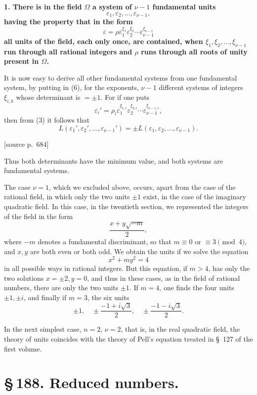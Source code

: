\documentclass[11pt]{article}
\newcommand{\srcpage}[1]{\par\medskip\noindent\textsf{[source p.~#1]}\par\smallskip}
\begin{document}
\textbf{1. There is in the field $\Omega$ a system of $\nu-1$ fundamental units}
\begin{equation}
\varepsilon_1,\varepsilon_2,\ldots,\varepsilon_{\nu-1},
\tag{5}
\end{equation}
\textbf{having the property that in the form}
\begin{equation}
\varepsilon=\rho\varepsilon_1^{\xi_1}\varepsilon_2^{\xi_2}\cdots\varepsilon_{\nu-1}^{\xi_{\nu-1}}
\tag{6}
\end{equation}
\textbf{all units of the field, each only once, are contained, when $\xi_1,\xi_2,\ldots,\xi_{\nu-1}$ run through all rational integers and $\rho$ runs through all roots of unity present in $\Omega$.}

It is now easy to derive all other fundamental systems from one fundamental system, by putting in (6), for the exponents, $\nu-1$ different systems of integers $\xi_{i,k}$ whose determinant is $=\pm1$. For if one puts
\[
\varepsilon_i'=\rho_i\varepsilon_1^{\xi_{1,i}}\varepsilon_2^{\xi_{2,i}}\cdots\varepsilon_{\nu-1}^{\xi_{\nu-1,i}},
\]
then from (3) it follows that
\[
L(\varepsilon_1',\varepsilon_2',\ldots,\varepsilon_{\nu-1}')=\pm L(\varepsilon_1,\varepsilon_2,\ldots,\varepsilon_{\nu-1}).
\]

\srcpage{684}
Thus both determinants have the minimum value, and both systems are fundamental systems.

The case $\nu=1$, which we excluded above, occurs, apart from the case of the rational field, in which only the two units $\pm1$ exist, in the case of the imaginary quadratic field. In this case, in the twentieth section, we represented the integers of the field in the form
\[
\frac{x+y\sqrt{-m}}{2},
\]
where $-m$ denotes a fundamental discriminant, so that $m\equiv0$ or $\equiv3\pmod 4$, and $x,y$ are both even or both odd. We obtain the units if we solve the equation
\[
x^2+my^2=4
\]
in all possible ways in rational integers. But this equation, if $m>4$, has only the two solutions $x=\pm2,y=0$, and thus in these cases, as in the field of rational numbers, there are only the two units $\pm1$. If $m=4$, one finds the four units $\pm1,\pm i$, and finally if $m=3$, the six units
\[
\pm1,
\quad \pm\frac{-1+i\sqrt3}{2},
\quad \pm\frac{-1-i\sqrt3}{2}.
\]

In the next simplest case, $n=2$, $\nu=2$, that is, in the real quadratic field, the theory of units coincides with the theory of Pell's equation treated in \S~127 of the first volume.


\section*{\S\,188. Reduced numbers.}
\end{document}
